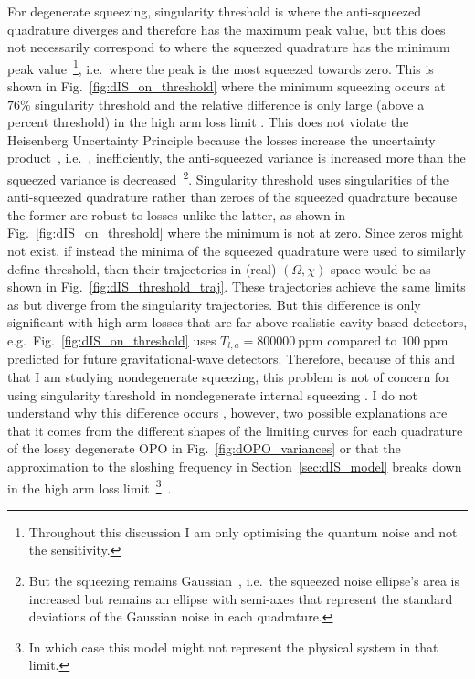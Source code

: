 For degenerate squeezing, singularity threshold is where the anti-squeezed quadrature diverges and therefore has the maximum peak value, but this does not necessarily correspond to where the squeezed quadrature has the minimum peak value~\footnote{Throughout this discussion I am only optimising the quantum noise and not the sensitivity.}, i.e.\ where the peak is the most squeezed towards zero. This is shown in Fig.~\ref{fig:dIS_on_threshold} where the minimum squeezing occurs at $76\%$  singularity threshold and the relative difference is only large (above a percent threshold) in the high arm loss limit . This does not violate the Heisenberg Uncertainty Principle because the losses increase the uncertainty product~\cite{}, i.e.\ , inefficiently, the anti-squeezed variance is increased more than the squeezed variance is decreased~\footnote{But the squeezing remains Gaussian~\cite{}, i.e.\ the squeezed noise ellipse's area is increased but remains an ellipse with semi-axes that represent the standard deviations of the Gaussian noise in each quadrature. }.  
Singularity threshold uses singularities of the anti-squeezed quadrature rather than zeroes of the squeezed quadrature because the former are robust to losses unlike the latter, as shown in Fig.~\ref{fig:dIS_on_threshold} where the minimum is not at zero. Since zeros might not exist, if instead the minima of the squeezed quadrature were used to similarly define threshold, then their trajectories in (real) $(\Omega,\chi)$ space would be as shown in Fig.~\ref{fig:dIS_threshold_traj}. These trajectories achieve the same limits as but diverge from the singularity trajectories. But this difference is only significant  with high arm losses that are far above realistic cavity-based detectors, e.g.\ Fig.~\ref{fig:dIS_on_threshold} uses $T_{l,a}=800000~\text{ppm}$ compared to $100~\text{ppm}$ predicted for future gravitational-wave detectors. Therefore, because of this and that I am studying nondegenerate squeezing, this problem is not of concern for using singularity threshold in nondegenerate internal squeezing . I do not understand why this difference occurs , however, two possible explanations are that it comes from the different shapes of the limiting curves for each quadrature of the lossy degenerate OPO in Fig.~\ref{fig:dOPO_variances} or that the approximation to the sloshing frequency in Section~\ref{sec:dIS_model} breaks down in the high arm loss limit~\footnote{In which case this model might not represent the physical system in that limit.}~\cite{}.


